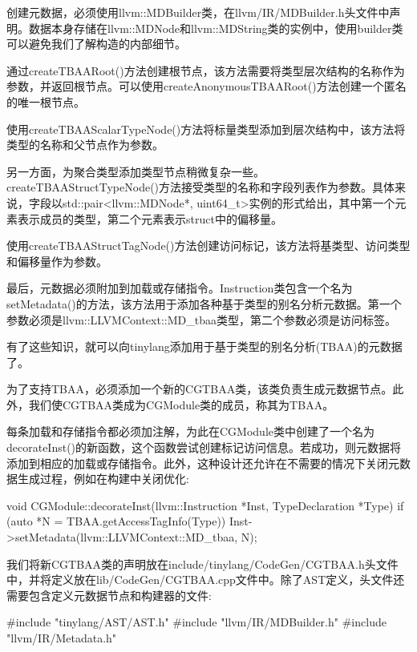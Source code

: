 创建元数据，必须使用llvm::MDBuilder类，在llvm/IR/MDBuilder.h头文件中声明。数据本身存储在llvm::MDNode和llvm::MDString类的实例中，使用builder类可以避免我们了解构造的内部细节。

通过createTBAARoot()方法创建根节点，该方法需要将类型层次结构的名称作为参数，并返回根节点。可以使用createAnonymousTBAARoot()方法创建一个匿名的唯一根节点。

使用createTBAAScalarTypeNode()方法将标量类型添加到层次结构中，该方法将类型的名称和父节点作为参数。

另一方面，为聚合类型添加类型节点稍微复杂一些。createTBAAStructTypeNode()方法接受类型的名称和字段列表作为参数。具体来说，字段以std::pair<llvm::MDNode*, uint64\_t>实例的形式给出，其中第一个元素表示成员的类型，第二个元素表示struct中的偏移量。

使用createTBAAStructTagNode()方法创建访问标记，该方法将基类型、访问类型和偏移量作为参数。

最后，元数据必须附加到加载或存储指令。Instruction类包含一个名为setMetadata()的方法，该方法用于添加各种基于类型的别名分析元数据。第一个参数必须是llvm::LLVMContext::MD\_tbaa类型，第二个参数必须是访问标签。

有了这些知识，就可以向tinylang添加用于基于类型的别名分析(TBAA)的元数据了。


为了支持TBAA，必须添加一个新的CGTBAA类，该类负责生成元数据节点。此外，我们使CGTBAA类成为CGModule类的成员，称其为TBAA。

每条加载和存储指令都必须加注解，为此在CGModule类中创建了一个名为decorateInst()的新函数，这个函数尝试创建标记访问信息。若成功，则元数据将添加到相应的加载或存储指令。此外，这种设计还允许在不需要的情况下关闭元数据生成过程，例如在构建中关闭优化:

\begin{cpp}
void CGModule::decorateInst(llvm::Instruction *Inst,
                            TypeDeclaration *Type) {
    if (auto *N = TBAA.getAccessTagInfo(Type))
        Inst->setMetadata(llvm::LLVMContext::MD_tbaa, N);
}
\end{cpp}

我们将新CGTBAA类的声明放在include/tinylang/CodeGen/CGTBAA.h头文件中，并将定义放在lib/CodeGen/CGTBAA.cpp文件中。除了AST定义，头文件还需要包含定义元数据节点和构建器的文件:

\begin{cpp}
#include "tinylang/AST/AST.h"
#include "llvm/IR/MDBuilder.h"
#include "llvm/IR/Metadata.h"
\end{cpp}

